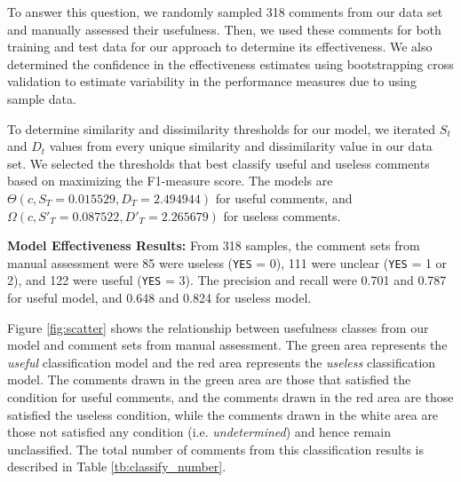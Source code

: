 To answer this question, we randomly sampled 318 comments from our data set and manually assessed their usefulness.
Then, we used these comments for both training and test data for our approach to determine its effectiveness.
We also determined the confidence in the effectiveness estimates using bootstrapping cross validation to estimate variability in the performance measures due to using sample data.


%

To determine similarity and dissimilarity thresholds for our model, we iterated $S_t$ and $D_t$ values from every unique similarity and dissimilarity value in our data set.
We selected the thresholds that best classify useful and useless comments based on maximizing the F1-measure score.
The models are $\Theta(c,S_T=0.015529,D_T=2.494944)$ for useful comments, and $\Omega(c,S'_T=0.087522,D'_T=2.265679)$ for useless comments.


\textbf{Model Effectiveness Results:} From 318 samples, the comment sets from manual assessment were 85 were useless (\texttt{YES} = 0),  111 were unclear (\texttt{YES} = 1 or 2), and 122 were useful (\texttt{YES} = 3). The precision and recall were 0.701 and 0.787 for useful model, and 0.648 and 0.824 for useless model. 

Figure \ref{fig:scatter} shows the relationship between usefulness classes from our model and comment sets from manual assessment. 
The green area represents the \emph{useful} classification model and the red area represents the \emph{useless} classification model. The comments drawn in the green area are those that satisfied the condition for useful comments, and the comments drawn in the red area are those satisfied the useless condition, while the comments drawn in the white area are those not satisfied any condition (i.e. \emph{undetermined}) and hence remain unclassified. 
The total number of comments from this classification results is described in Table \ref{tb:classify_number}. 



